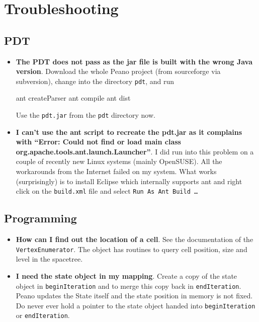 \chapter{Troubleshooting}

\section{PDT}

\begin{itemize}
  \item {\bf The PDT does not pass as the jar file is built with the wrong Java
  version}. Download the whole Peano project (from sourceforge via subversion),
  change into the directory \texttt{pdt}, and run
  \begin{code}
  ant createParser
  ant compile
  ant dist
  \end{code}
  Use the \texttt{pdt.jar} from the \texttt{pdt} directory now. 
  \item {\bf I can't use the ant script to recreate the pdt.jar as it complains
  with ``Error: Could not find or load main class
  org.apache.tools.ant.launch.Launcher''}. I did run into this problem on a
  couple of recently new Linux systems (mainly OpenSUSE). All the workarounds
  from the Internet failed on my system. What works (surprisingly) is to install
  Eclipse which internally supports ant and right click on the
  \texttt{build.xml} file and select \texttt{Run As Ant Build \ldots}
\end{itemize}





\section{Programming}

\begin{itemize}
  \item {\bf How can I find out the location of a cell}. See the documentation
  of the \texttt{VertexEnumerator}. The object has routines to query cell
  position, size and level in the spacetree.
  \item {\bf I need the state object in my mapping}. Create a copy of the state
  object in \texttt{beginIteration} and to merge this copy back in \texttt{endIteration}. 
  Peano updates the State itself and the state position in memory is not fixed.
  Do never ever hold a pointer to the state object handed into
  \texttt{beginIteration} or \texttt{endIteration}.
\end{itemize}

